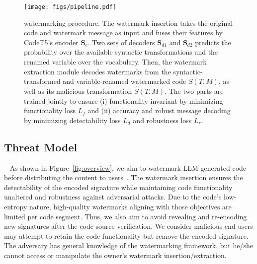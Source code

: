 \begin{figure*}[!ht]
    \centering
    \texttt{[image: figs/pipeline.pdf]}
     \vspace{-10pt}
    \caption{\sys{} watermarking procedure. The watermark insertion takes the original code and watermark message as input and fuses their features by CodeT5's encoder $\mathbf{S}_e$. Two sets of decoders $\mathbf{S}_{d1}$ and $\mathbf{S}_{d2}$ predicts the probability over the available syntactic transformations and the renamed variable over the vocabulary. Then, the watermark extraction module decodes watermarks from the syntactic-transformed and variable-renamed watermarked code $S(T, M)$, as well as its malicious transformation $\hat{S}(T, M)$. The two parts are trained jointly to ensure (i) functionality-invariant by minimizing functionality loss $L_f$ and (ii) accuracy and robust message decoding by minimizing detectability loss $L_d$ and robustness loss $L_r$.  }
    \label{fig:pipeline}
    \vspace{-5pt}
\end{figure*}

\subsection{Threat Model}~\label{sec:threat}
As shown in Figure~\ref{fig:overview}, we aim to watermark LLM-generated code before distributing the content to users~\cite{lee2023wrote,yang2024srcmarker}. The watermark insertion ensures the detectability of the encoded signature while maintaining code functionality unaltered and robustness against adversarial attacks. 
Due to the code's low-entropy nature, high-quality watermarks aligning with those objectives are limited per code segment.  
Thus, we also aim to avoid revealing and re-encoding new signatures after the code source verification.
We consider malicious end users may attempt to retain the code functionality but remove the encoded signature. The adversary has general knowledge of the watermarking framework, but he/she 
cannot access or manipulate the owner's watermark insertion/extraction.



